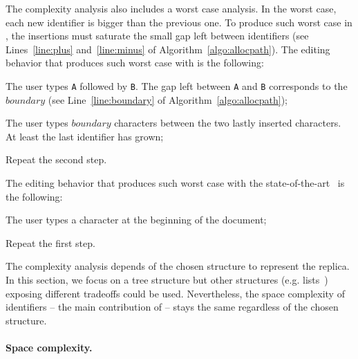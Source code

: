 \noindent The complexity analysis also includes a worst case analysis. In the
worst case, each new identifier is bigger than the previous one. To produce such
worst case in \LSEQ, the insertions must saturate the small gap left between
identifiers (see Lines~\ref{line:plus} and~\ref{line:minus} of
Algorithm~\ref{algo:allocpath}). The editing behavior that produces such worst
case with \LSEQ is the following:
\begin{inparaenum}[(1)]
\item The user types \texttt{A} followed by \texttt{B}. The gap left between
  \texttt{A} and \texttt{B} corresponds to the $boundary$ (see
  Line~\ref{line:boundary} of Algorithm~\ref{algo:allocpath});
\item The user types $boundary$ characters between the two lastly inserted
  characters. At least the last identifier has grown;
\item Repeat the second step.
\end{inparaenum}
The editing behavior that produces such worst case with the
state-of-the-art~\cite{preguica2009commutative, weiss2009logoot} is the
following:
\begin{inparaenum}[(1)]
\item The user types a character at the beginning of the document;
\item Repeat the first step.
\end{inparaenum}



The complexity analysis depends of the chosen structure to represent the
replica. In this section, we focus on a tree structure but other structures
(e.g. lists~\cite{weiss2009logoot}) exposing different tradeoffs could be
used. Nevertheless, the space complexity of identifiers -- the main contribution
of \LSEQ{} -- stays the same regardless of the chosen structure.




\paragraph{Space complexity.}

